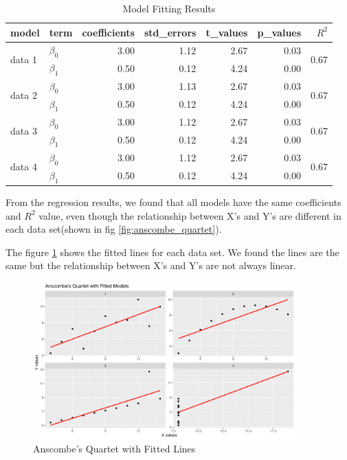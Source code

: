 \documentclass[12pt]{article}
\begin{document}
\begin{table}
  \centering
  \begin{tabular}{llrrrrr}
    \hline
  model & term & coefficients & std\_errors & t\_values & p\_values & $R^2$ \\ 
    \hline
  \multirow{2}{*}{data 1} & $\beta_0$ & 3.00 & 1.12 & 2.67 & 0.03 & \multirow{2}{*}{0.67} \\ 
    & $\beta_1$ & 0.50 & 0.12 & 4.24 & 0.00 &  \\ 
    \hline
  \multirow{2}{*}{data 2} & $\beta_0$ & 3.00 & 1.13 & 2.67 & 0.03 & \multirow{2}{*}{0.67} \\ 
    & $\beta_1$ & 0.50 & 0.12 & 4.24 & 0.00 &  \\ 
    \hline
  \multirow{2}{*}{data 3} & $\beta_0$ & 3.00 & 1.12 & 2.67 & 0.03 & \multirow{2}{*}{0.67} \\ 
    & $\beta_1$ & 0.50 & 0.12 & 4.24 & 0.00 &  \\ 
    \hline
  \multirow{2}{*}{data 4} & $\beta_0$ & 3.00 & 1.12 & 2.67 & 0.03 & \multirow{2}{*}{0.67} \\ 
    & $\beta_1$ & 0.50 & 0.12 & 4.24 & 0.00 &  \\ 
     \hline
  \end{tabular}
  \caption{Model Fitting Results} 
  \label{tab:model_fitting_results}
\end{table}
From the regression results, we found that all models have the same coefficients and \(R^2\) value, 
even though the relationship between X's and Y's are different in each data set(shown in fig \ref{fig:anscombe_quartet}).

The figure \ref{fig:anscombe_quartet_fitted} shows the fitted lines for each data set. We found the lines are the same but 
the relationship between X's and Y's are not always linear.

\begin{figure}[!h]
    \centering
    \includegraphics[width=0.9\textwidth]{../results/anscombe_quartet_fitted.png}
    \caption{Anscombe's Quartet with Fitted Lines}
    \label{fig:anscombe_quartet_fitted}
\end{figure}
\end{document}

